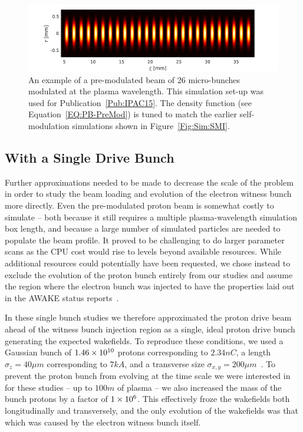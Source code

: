 \begin{figure}[hbt]
    \centering
    \includegraphics[width=0.9375\linewidth,trim={0mm 0mm 0mm 0mm},clip]{figures/PBPreMod}
    \caption{\label{Fig:PBPreMod}
        An example of a pre-modulated beam of 26 micro-bunches modulated at the plasma wavelength.
        This simulation set-up was used for Publication~\ref{Pub:IPAC15}.
        The density function (see Equation~\ref{EQ:PB-PreMod}) is tuned to match the earlier self-modulation simulations shown in Figure~\ref{Fig:Sim:SMI}.
    }
\end{figure}


\subsection{With a Single Drive Bunch}
\label{Sim:PBSingle}

Further approximations needed to be made to decrease the scale of the problem in order to study the beam loading and evolution of the electron witness bunch more directly.
Even the pre-modulated proton beam is somewhat costly to simulate -- both because it still requires a multiple plasma-wavelength simulation box length, and because a large number of simulated particles are needed to populate the beam profile.
It proved to be challenging to do larger parameter scans as the CPU cost would rise to levels beyond available resources.
While additional resources could potentially have been requested, we chose instead to exclude the evolution of the proton bunch entirely from our studies and assume the region where the electron bunch was injected to have the properties laid out in the AWAKE status reports~\cite{awake_collaboration:2016}.

In these single bunch studies we therefore approximated the proton drive beam ahead of the witness bunch injection region as a single, ideal proton drive bunch generating the expected wakefields.
To reproduce these conditions, we used a Gaussian bunch of $1.46\times 10^{10}$ protons corresponding to $2.34\unit{nC}$, a length $\sigma_{z} = 40\unit{\mu m}$ corresponding to $7\unit{kA}$, and a transverse size $\sigma_{x,y}=200\unit{\mu m}$~\cite{berglyd_olsen:2018}.
To prevent the proton bunch from evolving at the time scale we were interested in for these studies -- up to $100\unit{m}$ of plasma -- we also increased the mass of the bunch protons by a factor of $1\times 10^{6}$.
This effectively froze the wakefields both longitudinally and transversely, and the only evolution of the wakefields was that which was caused by the electron witness bunch itself.

